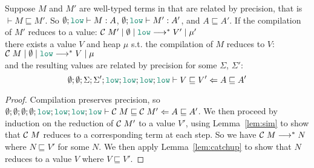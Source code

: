 \begin{theorem}
\label{thm:gg}
Suppose $M$ and $M'$ are well-typed terms in \Surface
that are related by precision, that is $\vdash M \sqsubseteq M'$.
So $\emptyset ; \low \vdash M : A$, $\emptyset ; \low \vdash M' : A'$,
and $A \sqsubseteq A'$.
If the compilation of $M'$ reduces to a value:
$\compile{M'}\mid\emptyset\mid\low \longrightarrow^{*} V'\mid\mu'$ \\
there exists a value $V$ and heap $\mu$ s.t. the compilation of $M$ reduces to $V$:
$\compile{M}\mid\emptyset\mid\low \longrightarrow^{*} V\mid\mu$ \\ and
the resulting values are related by precision for some $\Sigma$,
$\Sigma'$:
$$\precctx{\emptyset}{\emptyset}{\Sigma}{\Sigma'}{\low}{\low}{\low}{\low}\ccprec{V}{V'}{A}{A'}$$
\end{theorem}
\begin{proof}
  Compilation preserves precision, so
  $\precctx{\emptyset}{\emptyset}{\emptyset}{\emptyset}{\low}{\low}{\low}{\low}\ccprec{\compile{M}}{\compile{M'}}{A}{A'}$.
  We then proceed by induction on the reduction of $\mathcal{C}\;{M'}$ to a value $V'$,
  using Lemma~\ref{lem:sim} to show that $\mathcal{C}\;{M}$ reduces to a corresponding term at each step.
  So we have $\mathcal{C}\;{M} \longrightarrow^{*} N$ where $N \sqsubseteq V'$ for some $N$.
  We then apply Lemma~\ref{lem:catchup} to show that $N$ reduces to a value $V$ where $V \sqsubseteq V'$.
\end{proof}
